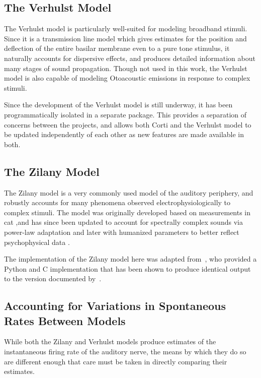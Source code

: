 \subsection{The Verhulst Model} %
\label{sub:the_verhulst_model1}
The Verhulst model is particularly well-suited for modeling broadband stimuli.  Since it is a transmission line model which gives estimates for the position and deflection of the entire basilar membrane even to a pure tone stimulus, it naturally accounts for dispersive effects, and produces detailed information about many stages of sound propagation. Though not used in this work, the Verhulst model is also capable of modeling Otoacoustic emissions in response to complex stimuli. 

Since the development of the Verhulst model is still underway, it has been programmatically isolated in a separate package.  This provides a separation of concerns between the projects, and allows both Corti and the Verhulst model to be updated independently of each other as new features are made available in both.
\subsection{The Zilany Model} %
\label{sub:the_zilany_model}
The Zilany model is a very commonly used model of the auditory periphery, and robustly accounts for many phenomena observed electrophysiologically to complex stimuli.  The model was originally developed based on measurements in cat \citep{Zilany2006Modeling},and has since been updated to account for spectrally complex sounds via power-law adaptation \citep{Zilany2007Predictions} and later with humanized parameters to better reflect psychophysical data \citep{Zilany2014Updated}. 

The implementation of the Zilany model here was adapted from~\cite{Rudnicki2014Cochlea}, who provided a Python and C implementation that has been shown to produce identical output to the version documented by~\cite{Zilany2014Updated}.

\subsection{Accounting for Variations in Spontaneous Rates Between Models} %
\label{sub:interoperability_of_the_zilany_and_verhulst_models}
While both the Zilany and Verhulst models produce estimates of the instantaneous firing rate of the auditory nerve, the means by which they do so are different enough that care must be taken in directly comparing their estimates.  

